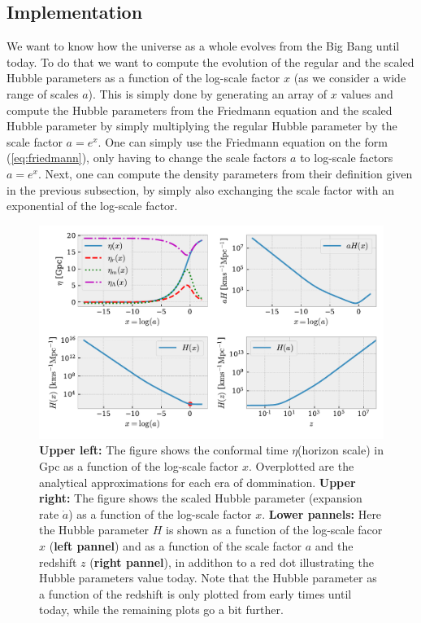 \documentclass[twocolumn]{aastex62}
\begin{document}
\subsection{Implementation}

We want to know how the universe as a whole evolves from the Big Bang until
today. To do that we want to compute the evolution of the regular and the scaled
Hubble parameters as a function of the log-scale factor $x$ (as we consider a wide
range of scales $a$). This is simply done by generating an array of $x$ values
and compute the Hubble parameters from the Friedmann equation
and the scaled Hubble parameter by simply multiplying the
regular Hubble parameter by the scale factor $a = e^x$. One can simply use the
Friedmann equation on the form (\ref{eq:friedmann}), only having to change the
scale factors $a$ to log-scale factors $a = e^x$. Next, one can compute the
density parameters from their definition given in the previous subsection, by
simply also exchanging the scale factor with an exponential of the log-scale
factor. 
\begin{figure}
    \includegraphics[scale=1]{Figures/Eta_&_H_of_x.pdf}
    \caption{\textbf{Upper left:} The figure shows the conformal time $\eta$(horizon scale) in Gpc as a function of the log-scale factor $x$. Overplotted are the analytical approximations for each era of dommination. \textbf{Upper right:} The figure shows the scaled Hubble parameter (expansion rate $\dot{a}$) as a function of the log-scale factor $x$. \textbf{Lower pannels:} Here the Hubble parameter $H$ is shown as a function of the log-scale facor $x$ (\textbf{left pannel}) and as a function of the scale factor $a$ and the redshift $z$ (\textbf{right pannel}), in addithon to a red dot illustrating the Hubble parameters value today. Note that the Hubble parameter as a function of the redshift is only plotted from early times until today, while the remaining plots go a bit further.}
    \label{fig:Eta}
\end{figure}
\end{document}
